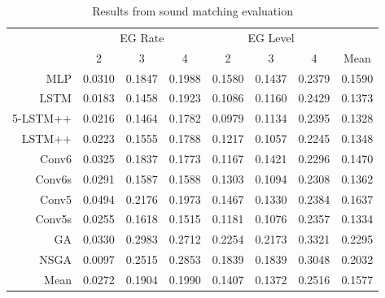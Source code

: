\begin{table}[ht]
\centering
\begin{tabular}{r|ccc|ccc|c}
\toprule
{} & \multicolumn{3}{c}{EG Rate} & \multicolumn{3}{c}{EG Level} & {} \\
{} & 2 & 3 & 4 & 2 & 3 & 4 & Mean \\
\midrule
MLP      &     0.0310 &     0.1847 &     0.1988 &      0.1580 &      0.1437 &      0.2379 &   0.1590 \\
LSTM     &     0.0183 &     0.1458 &     0.1923 &      0.1086 &      0.1160 &      0.2429 &   0.1373 \\
5-LSTM++ &     0.0216 &     0.1464 &     0.1782 &      0.0979 &      0.1134 &      0.2395 &   0.1328 \\
LSTM++   &     0.0223 &     0.1555 &     0.1788 &      0.1217 &      0.1057 &      0.2245 &   0.1348 \\
Conv6    &     0.0325 &     0.1837 &     0.1773 &      0.1167 &      0.1421 &      0.2296 &   0.1470 \\
Conv6s   &     0.0291 &     0.1587 &     0.1588 &      0.1303 &      0.1094 &      0.2308 &   0.1362 \\
Conv5    &     0.0494 &     0.2176 &     0.1973 &      0.1467 &      0.1330 &      0.2384 &   0.1637 \\
Conv5s   &     0.0255 &     0.1618 &     0.1515 &      0.1181 &      0.1076 &      0.2357 &   0.1334 \\
GA       &     0.0330 &     0.2983 &     0.2712 &      0.2254 &      0.2173 &      0.3321 &   0.2295 \\
NSGA     &     0.0097 &     0.2515 &     0.2853 &      0.1839 &      0.1839 &      0.3048 &   0.2032 \\
\midrule
Mean  &     0.0272 &     0.1904 &     0.1990 &      0.1407 &      0.1372 &      0.2516 &   0.1577 \\
\bottomrule
\end{tabular}
\caption{Results from sound matching evaluation}
\label{tbl:param_eval_eg}
\end{table}


